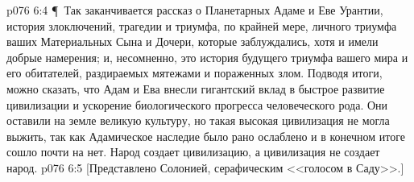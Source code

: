 \vs p076 6:4 \P\ Так заканчивается рассказ о Планетарных Адаме и Еве Урантии, история злоключений, трагедии и триумфа, по крайней мере, личного триумфа ваших Материальных Сына и Дочери, которые заблуждались, хотя и имели добрые намерения; и, несомненно, это история будущего триумфа вашего мира и его обитателей, раздираемых мятежами и пораженных злом. Подводя итоги, можно сказать, что Адам и Ева внесли гигантский вклад в быстрое развитие цивилизации и ускорение биологического прогресса человеческого рода. Они оставили на земле великую культуру, но такая высокая цивилизация не могла выжить, так как Адамическое наследие было рано ослаблено и в конечном итоге сошло почти на нет. Народ создает цивилизацию, а цивилизация не создает народ.
\vs p076 6:5 [Представлено Солонией, серафическим <<голосом в Саду>>.]
